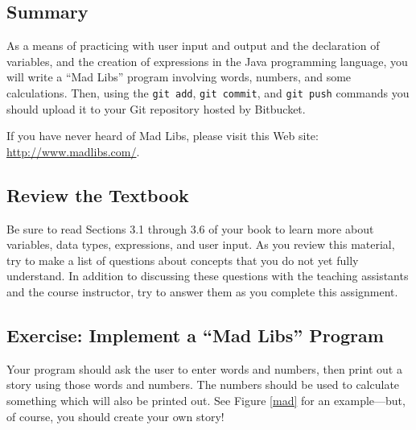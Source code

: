 



\subsection*{Summary}

As a means of practicing with user input and output and the declaration of variables, and the creation of expressions in
the Java programming language, you will write a ``Mad Libs'' program involving words, numbers, and some calculations.
Then, using the {\tt git add}, {\tt git commit}, and {\tt git push} commands you should upload it to your Git repository
hosted by Bitbucket.  

\noindent
If you have never heard of Mad Libs, please visit this Web site: \url{http://www.madlibs.com/}. 

\subsection*{Review the Textbook}

Be sure to read Sections 3.1 through 3.6 of your book to learn more about variables, data types, expressions, and user
input.  As you review this material, try to make a list of questions about concepts that you do not yet fully
understand.  In addition to discussing these questions with the teaching assistants and the course instructor, try to
answer them as you complete this assignment.

\subsection*{Exercise: Implement a ``Mad Libs'' Program} 

Your program should ask the user to enter words and numbers, then print out a story using those words and numbers. The
numbers should be used to calculate something which will also be printed out. See Figure \ref{mad} for an example---but,
of course, you should create your own story!

